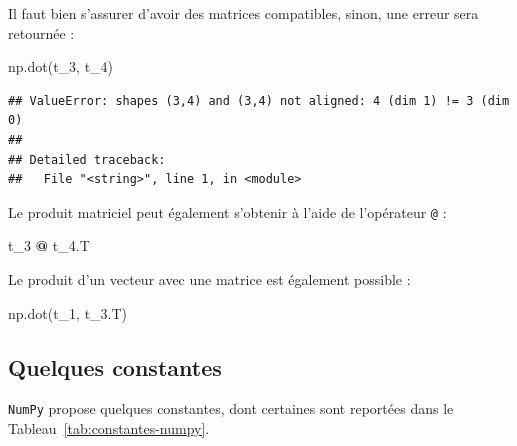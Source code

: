 \documentclass[12pt,]{book}
\newenvironment{Shaded}{\begin{snugshade}}{\end{snugshade}}
\newcommand{\OperatorTok}[1]{\textcolor[rgb]{0.81,0.36,0.00}{\textbf{#1}}}
\newcommand{\NormalTok}[1]{#1}
\numberwithin{equation}{section}
\numberwithin{countremarque}{section}
\begin{document}
Il faut bien s'assurer d'avoir des matrices compatibles, sinon, une
erreur sera retournée :

\begin{Shaded}
\begin{Highlighting}[]
\NormalTok{np.dot(t_3, t_4)}
\end{Highlighting}
\end{Shaded}

\begin{lstlisting}
## ValueError: shapes (3,4) and (3,4) not aligned: 4 (dim 1) != 3 (dim 0)
## 
## Detailed traceback: 
##   File "<string>", line 1, in <module>
\end{lstlisting}

Le produit matriciel peut également s'obtenir à l'aide de l'opérateur
\texttt{@} :

\begin{Shaded}
\begin{Highlighting}[]
\NormalTok{t_3 }\OperatorTok{@}\NormalTok{ t_4.T}
\end{Highlighting}
\end{Shaded}

Le produit d'un vecteur avec une matrice est également possible :

\begin{Shaded}
\begin{Highlighting}[]
\NormalTok{np.dot(t_1, t_3.T)}
\end{Highlighting}
\end{Shaded}

\subsection{Quelques constantes}\label{quelques-constantes-1}

\texttt{NumPy} propose quelques constantes, dont certaines sont
reportées dans le Tableau~\ref{tab:constantes-numpy}.
\end{document}
